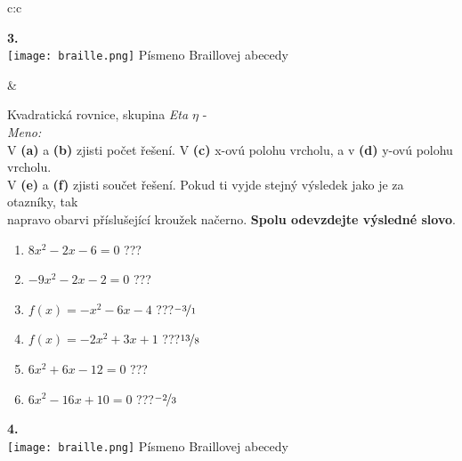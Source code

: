 \documentclass[10pt]{report}
\begin{document}
\begin{tabular}{c:c}
\begin{minipage}[c][99mm][t]{0.49\linewidth}
\begin{center}
\begin{minipage}{0.20\linewidth}
\begin{center}
{\Huge\bfseries 3.} \\[2mm]
\texttt{[image: braille.png]}
{\small Písmeno Braillovej abecedy}
\end{center}
\end{minipage}
\end{center}
\end{minipage}
&
\begin{minipage}[c][99mm][t]{0.49\linewidth}
\begin{center}
\vspace{7mm}
{\huge Kvadratická rovnice, skupina \textit{Eta $\eta$} -}\\[4.5mm]
\textit{Meno:}\phantom{xxxxxxxxxxxxxxxxxxxxxxxxxxxxxxxxxxxxxxxxxxxxxxxxxxxxxxxxxxxxxxxxx}\\[3.5mm]
V \textbf{(a)} a \textbf{(b)} zjisti počet řešení. V \textbf{(c)} x-ovú polohu vrcholu, a v \textbf{(d)} y-ovú polohu vrcholu.\\V \textbf{(e)} a \textbf{(f)} zjisti součet řešení. Pokud ti vyjde stejný výsledek jako je za otazníky, tak\\napravo obarvi příslušející kroužek načerno. \textbf{Spolu odevzdejte výsledné slovo}.\\[3mm]
\begin{minipage}{0.77\linewidth}
\begin{center}
\begin{varwidth}{\textwidth}
\begin{enumerate}
\large
\item $8x^2-2x-6=0$\quad \dotfill\; ???\;\dotfill {}
\item $-9x^2-2x-2=0$\quad \dotfill\; ???\;\dotfill {}
\item $f(x)=-x^2-6x-4$\quad \dotfill\; ???\;\dotfill \quad $\nicefrac{-3}{1}$
\item $f(x)=-2x^2+3x+1$\quad \dotfill\; ???\;\dotfill \quad $\nicefrac{13}{8}$
\item $6x^2+6x-12=0$\quad \dotfill\; ???\;\dotfill {}
\item $6x^2-16x+10=0$\quad \dotfill\; ???\;\dotfill \quad $\nicefrac{-2}{3}$
\end{enumerate}
\end{varwidth}
\end{center}
\end{minipage}
\begin{minipage}{0.20\linewidth}
\begin{center}
{\Huge\bfseries 4.} \\[2mm]
\texttt{[image: braille.png]}
{\small Písmeno Braillovej abecedy}
\end{center}
\end{minipage}
\end{center}
\end{minipage}

\end{tabular}
\end{document}
